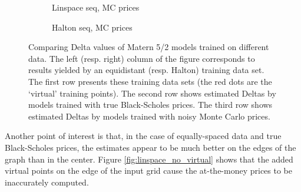 \documentclass[a4paper,12pt]{article}
\begin{document}
\begin{figure} [H]
     \begin{subfigure}[b]{0.49\textwidth}
         \centering
    \caption{Linspace seq, MC prices}
    \label{fig:linspace_mc_prices}
     \end{subfigure}
     \hfill
     \begin{subfigure}[b]{0.49\textwidth}
         \centering
    \caption{Halton seq, MC prices}
    \label{fig:halton_mc_prices}
     \end{subfigure}
    \caption{Comparing Delta values of Matern 5/2 models trained on different data. The left (resp. right) column of the figure corresponds to results yielded by an equidistant (resp. Halton) training data set. The first row presents these training data sets (the red dots are the `virtual' training points). The second row shows estimated Deltas by models trained with true Black-Scholes prices. The third row shows estimated Deltas by models trained with noisy Monte Carlo prices.}
    \label{fig:comparing_training_data}
\end{figure}
\noindent Another point of interest is that, in the case of equally-spaced data and true Black-Scholes prices, the estimates appear to be much better on the edges of the graph than in the center. Figure \ref{fig:linspace_no_virtual} shows that the added virtual points on the edge of the input grid cause the at-the-money prices to be inaccurately computed.
\end{document}
